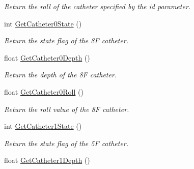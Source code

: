 \begin{DoxyCompactItemize}
\begin{DoxyCompactList}\small\item\em Return the roll of the catheter specified by the id parameter. \item\end{DoxyCompactList}\item 
\hypertarget{classvtkVSP_a273686a9916cd9ee186eaba47f5c6821}{
int \hyperlink{classvtkVSP_a273686a9916cd9ee186eaba47f5c6821}{GetCatheter0State} ()}
\label{classvtkVSP_a273686a9916cd9ee186eaba47f5c6821}

\begin{DoxyCompactList}\small\item\em Return the state flag of the 8F catheter. \item\end{DoxyCompactList}\item 
\hypertarget{classvtkVSP_ac8f05fd20cd3e3a46d7905b8a74047a4}{
float \hyperlink{classvtkVSP_ac8f05fd20cd3e3a46d7905b8a74047a4}{GetCatheter0Depth} ()}
\label{classvtkVSP_ac8f05fd20cd3e3a46d7905b8a74047a4}

\begin{DoxyCompactList}\small\item\em Return the depth of the 8F catheter. \item\end{DoxyCompactList}\item 
\hypertarget{classvtkVSP_a25bd4f1453fed3313fd6311b7d59be98}{
float \hyperlink{classvtkVSP_a25bd4f1453fed3313fd6311b7d59be98}{GetCatheter0Roll} ()}
\label{classvtkVSP_a25bd4f1453fed3313fd6311b7d59be98}

\begin{DoxyCompactList}\small\item\em Return the roll value of the 8F catheter. \item\end{DoxyCompactList}\item 
\hypertarget{classvtkVSP_a60c7a368b17b23ddc9e8899211318d1e}{
int \hyperlink{classvtkVSP_a60c7a368b17b23ddc9e8899211318d1e}{GetCatheter1State} ()}
\label{classvtkVSP_a60c7a368b17b23ddc9e8899211318d1e}

\begin{DoxyCompactList}\small\item\em Return the state flag of the 5F catheter. \item\end{DoxyCompactList}\item 
\hypertarget{classvtkVSP_a00f912f5e3a6b995341ea59712a09609}{
float \hyperlink{classvtkVSP_a00f912f5e3a6b995341ea59712a09609}{GetCatheter1Depth} ()}
\label{classvtkVSP_a00f912f5e3a6b995341ea59712a09609}


\end{DoxyCompactItemize}
